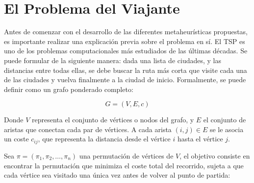 %
%
%
% 
%
%
%
%

\chapter{El Problema del Viajante}
\label{cha:desarrollo}

Antes de comenzar con el desarrollo de las diferentes metaheurísticas propuestas, es importante realizar una explicación 
previa sobre el problema en sí. El \ac{TSP} es uno de los problemas computacionales más estudiados de las últimas décadas.
Se puede formular de la siguiente manera: dada una lista de ciudades, y las distancias entre todas ellas, se debe buscar la 
ruta más corta que visite cada una de las ciudades y vuelva finalmente a la ciudad de inicio. Formalmente, se puede definir
como un grafo ponderado completo:

\begin{equation}
  \label{eq:eq1}
  G = (V, E, c)
\end{equation}

Donde $V$ representa el conjunto de vértices o nodos del grafo, y $E$ el conjunto de aristas que conectan cada par de vértices.
A cada arista $(i, j) \in E$ se le asocia un coste $c_{ij}$, que representa la distancia desde el vértice $i$ hasta el vértice 
$j$.

Sea $\pi = ({\pi}_{1}, {\pi}_{2}, \dots , {\pi}_{n})$ una permutación de vértices de $V$, el objetivo consiste en encontrar la 
permutación que minimiza el coste total del recorrido, sujeta a que cada vértice sea visitado una única vez antes de volver al 
punto de partida:

